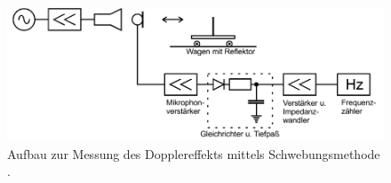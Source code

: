 \begin{figure}
  \includegraphics[width = \textwidth]{./Abbildungen/Schwebung.PNG}
  \caption{Aufbau zur Messung des Dopplereffekts mittels Schwebungsmethode \cite{Anleitung}.}
  \label{fig:Schwebung}
\end{figure}
